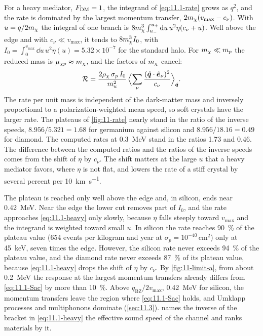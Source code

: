For a heavy mediator, $F_{\mathrm{DM}} = 1$, the integrand of \cref{eq:11.1-rate} grows as $q^2$, and the rate is dominated by the largest momentum transfer, $2m_{\chi}(v_{\mathrm{max}} - c_\nu)$. With $u = q/2m_{\chi}$ the integral of one branch is $8m_{\chi}^3\int_{u_-}^{u_+}\mathrm{d} u\,u^2\eta(c_\nu + u)$. Well above the edge and with $c_\nu \ll v_{\mathrm{max}}$, it tends to $8m_{\chi}^3I_0$, with $I_0 = \int_0^{v_{\mathrm{max}}}\dd u\,u^2\eta(u) = 5.32\times10^{-7}$ for the standard halo. For $m_{\chi} \ll m_p$ the reduced mass is $\mu_{\chi p} \approx m_{\chi}$, and the factors of $m_{\chi}$ cancel:
\begin{equation}
  \mathcal{R} = \frac{2\rho_\chi\,\sigma_p\,I_0}{m_u^2}\,\Bigl\langle\sum_\nu\frac{(\hat{\bm{q}}\cdot\hat{\bm{e}}_\nu)^2}{c_\nu}\Bigr\rangle_{\hat{\bm{q}}} .
  \label{eq:11.1-heavy}
\end{equation}
The rate per unit mass is independent of the dark-matter mass and inversely proportional to a polarization-weighted mean speed, so soft crystals have the larger rate. The plateaus of \cref{fig:11-rate} nearly stand in the ratio of the inverse speeds, $8.956/5.321 = 1.68$ for germanium against silicon and $8.956/18.16 = 0.49$ for diamond. The computed rates at \SI{0.3}{MeV} stand in the ratios 1.73 and 0.46. The difference between the computed ratios and the ratios of the inverse speeds comes from the shift of $\eta$ by $c_\nu$. The shift matters at the large $u$ that a heavy mediator favors, where $\eta$ is not flat, and lowers the rate of a stiff crystal by several percent per \SI{10}{km.s^{-1}}.

The plateau is reached only well above the edge and, in silicon, ends near \SI{0.42}{MeV}. Near the edge the lower cut removes part of $I_0$, and the rate approaches \cref{eq:11.1-heavy} only slowly, because $\eta$ falls steeply toward $v_{\mathrm{max}}$ and the integrand is weighted toward small $u$. In silicon the rate reaches \SI{90}{\percent} of the plateau value (654 events per kilogram and year at $\sigma_p = 10^{-40}\,\mathrm{cm^2}$) only at \SI{45}{keV}, seven times the edge. However, the silicon rate never exceeds \SI{94}{\percent} of the plateau value, and the diamond rate never exceeds \SI{87}{\percent} of its plateau value, because \cref{eq:11.1-heavy} drops the shift of $\eta$ by $c_\nu$. By \cref{fig:11-limit-a}, from about \SI{0.2}{MeV} the response at the largest momentum transfers already differs from \cref{eq:11.1-Sac} by more than \SI{10}{\percent}. Above $q_{\mathrm{BZ}}/2v_{\mathrm{max}}$, \SI{0.42}{MeV} for silicon, the momentum transfers leave the region where \cref{eq:11.1-Sac} holds, and Umklapp processes and multiphonons dominate (\cref{sec:11.3}).  names the inverse of the bracket in \cref{eq:11.1-heavy} the effective sound speed of the channel and ranks materials by it.

